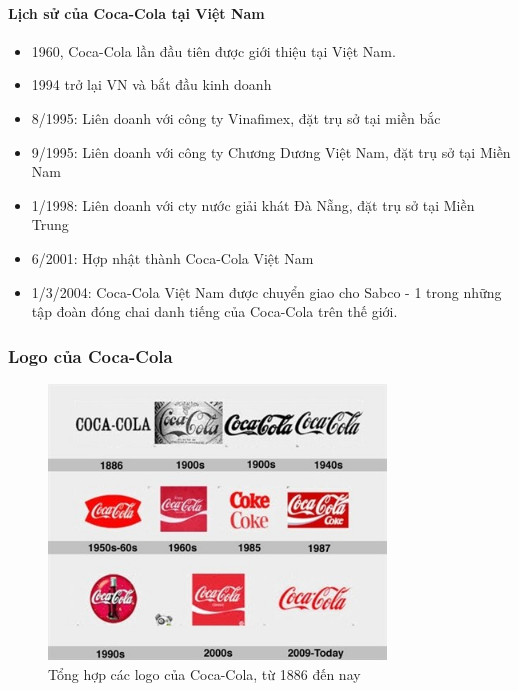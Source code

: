 \documentclass{article}
\begin{document}
        \paragraph{Lịch sử của Coca-Cola tại Việt Nam}
        \begin{itemize}
            \item 1960, Coca-Cola lần đầu tiên được giới thiệu tại Việt Nam.
            \item 1994 trở lại VN và bắt đầu kinh doanh
            \item 8/1995: Liên doanh với công ty Vinafimex, đặt trụ sở tại miền bắc
            \item 9/1995: Liên doanh với công ty Chương Dương Việt Nam, đặt trụ sở tại Miền Nam
            \item 1/1998: Liên doanh với cty nước giải khát Đà Nẵng, đặt trụ sở tại Miền Trung
            \item 6/2001: Hợp nhật thành Coca-Cola Việt Nam
            \item 1/3/2004: Coca-Cola Việt Nam được chuyển giao cho Sabco - 1 trong những tập đoàn đóng chai danh tiếng của Coca-Cola trên thế giới.
        \end{itemize}

    \subsubsection{Logo của Coca-Cola}
    \begin{figure}[H]
        \centering
        \includegraphics[width=0.8\textwidth]{assert/img4.jpg}
        \caption{Tổng hợp các logo của Coca-Cola, từ 1886 đến nay}
        \label{fig:img4}
    \end{figure}
\end{document}
